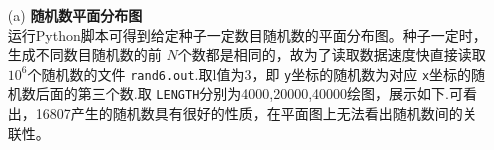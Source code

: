 \documentclass[12pt,a4paper,utf8]{ctexart}
\begin{document}
\begin{enumerate}
    \item[(a)] \textbf{随机数平面分布图}\\
        运行Python脚本可得到给定种子一定数目随机数的平面分布图。种子一定时，生成不同数目随机数的前
        $N$个数都是相同的，故为了读取数据速度快直接读取 $10^6$个随机数的文件
        \texttt{rand6.out}.取l值为3，即 \texttt{y}坐标的随机数为对应
        \texttt{x}坐标的随机数后面的第三个数.取
        \texttt{LENGTH}分别为4000,20000,40000绘图，展示如下.可看出，16807产生的随机数具有很好的性质，在平面图上无法看出随机数间的关联性。
\begin{figure}[h]
    \centering
    \hfill
    \hfill

\end{figure}
\end{enumerate}
\end{document}
